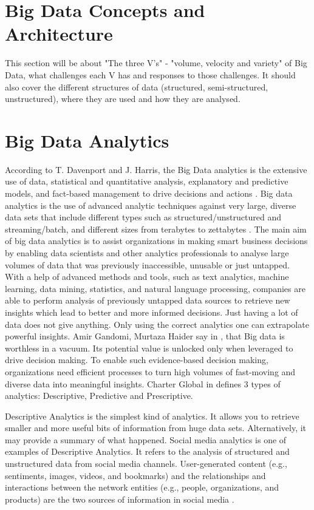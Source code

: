 \documentclass[runningheads]{llncs}
\begin{document}
\section{Big Data Concepts and Architecture}
This section will be about "The three V's" - "volume, velocity and variety" of Big Data, what challenges each V has and responses to those challenges. It should also cover the different structures of data (structured, semi-structured, unstructured), where they are used and how they are analysed.

\section{Big Data Analytics}
According to T. Davenport and J. Harris, the Big Data analytics is the extensive use of data, statistical and quantitative analysis, explanatory and predictive models, and fact-based management to drive decisions and actions \cite{DAVBOOK}. Big data analytics is the use of advanced analytic techniques against very large, diverse data sets that include different types such as structured/unstructured and streaming/batch, and different sizes from terabytes to zettabytes \cite{IBM}. The main aim of big data analytics is to assist organizations in making smart business decisions by enabling data scientists and other analytics professionals to analyse large volumes of data that  was previously inaccessible, unusable or just untapped.  With a help of advanced methods and tools, such as text analytics, machine learning, data mining, statistics, and natural language processing, companies are able to perform analysis of previously untapped data sources to retrieve new insights which lead to better and more informed decisions. Just having a lot of data does not give anything. Only using the correct analytics one can extrapolate powerful insights. Amir Gandomi, Murtaza Haider say in \cite{ELS}, that Big data is worthless in a vacuum. Its potential value is unlocked only when leveraged to drive decision making. To enable such evidence-based decision making, organizations need efficient processes to turn high volumes of fast-moving and diverse data into meaningful insights. Charter Global in \cite{CHARTER} defines 3 types of analytics: Descriptive, Predictive and Prescriptive. 

Descriptive Analytics is the simplest kind of analytics. It allows you to retrieve smaller and more useful bits of information from huge data sets. Alternatively, it may provide a summary of what happened. Social media analytics is one of examples of Descriptive Analytics. It refers to the analysis of structured and unstructured data from social media channels. User-generated content (e.g., sentiments, images, videos, and bookmarks) and the relationships and interactions between the network entities (e.g., people, organizations, and products) are the two sources of information in social media \cite{ELS}. 
\end{document}
